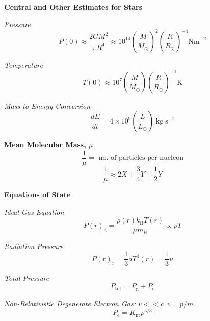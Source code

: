 \documentclass{article}
\begin{document}
\textbf {Central and Other Estimates for Stars}

\textit{Pressure}
\begin{equation}
P(0) \approx \frac{2 G M^2}{\pi R^4} \approx 10^{14} \left( \frac{M}{M_\odot} \right)^2  \left( \frac{R}{R_\odot} \right)^{-4} \mathrm{N m}^{-2}
\end{equation}

\textit{Temperature}
\begin{equation}
T(0) \approx 10^7 \left( \frac{M}{M_\odot} \right)  \left( \frac{R}{R_\odot} \right)^{-1} \mathrm{K}
\end{equation}

\textit{Mass to Energy Conversion}
\begin{equation}
\frac{dE}{dt} =  4 \times 10^{9}  \left( \frac{L}{L_\odot} \right) \; \mathrm{kg \; s}^{-1}
\end{equation}



\textbf{Mean Molecular Mass, \(\mu\)}
\begin{equation}
\frac{1}{\mu} = \text{ no. of particles per nucleon}
\end{equation}
\begin{equation}
\frac{1}{\mu} \approx 2X + \frac{3}{4}Y +  \frac{1}{2}Y
\end{equation}
\begin{center}
\end{center}



\textbf {Equations of State}


\textit {Ideal Gas Equation}
\begin{equation}
P(r)_\mathrm{g} = \frac {\rho(r) k_\mathrm{B} T(r)}{\mu m_\mathrm{H}} \propto \rho T
\end{equation}

\textit {Radiation Pressure}
\begin{equation}
P(r)_\mathrm{r} = \frac {1}{3} a T^4(r) = \frac {1}{3} u
\end{equation}

\textit{Total Pressure}
\begin{equation}
P_\mathrm{tot} = P_\mathrm{g} + P_\mathrm{r}
\end{equation}

\textit {Non-Relativistic Degenerate Electron Gas: \(v<<c, v = p/m\)}
\begin{equation}
P_\mathrm{e} = K_\mathrm{nr} \rho^{5/3}
\end{equation}
\end{document}
